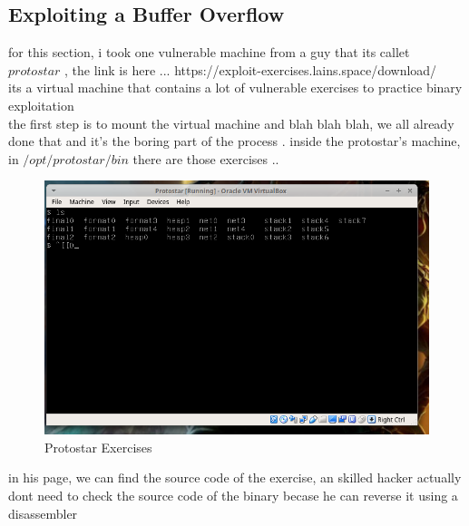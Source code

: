 \documentclass[10pt,a4paper]{article} %
\begin{document}
            \subsection{Exploiting a Buffer Overflow}
                for this section, i took one vulnerable machine from a guy that its
                callet $ protostar  $  , the link is here ...
                https://exploit-exercises.lains.space/download/
                \\ its a virtual machine that contains a lot of vulnerable
                exercises to practice binary exploitation
                \\ the first step is to mount the virtual machine and blah blah
                blah, we all already done that and it's the boring part of the process .
                inside the protostar's machine, in $ /opt/protostar/bin  $ there are those exercises ..
                \\
                \begin{figure}[h!]
                    \centering
                    \includegraphics[width=0.5\linewidth]{proto.png}
                    \caption{Protostar Exercises}
                    \label{fig:proto}
                \end{figure}
                in his page, we can find the source code of the exercise, an
                skilled hacker actually dont need to check the source code of the
                binary becase he can reverse it using a disassembler
                \\
\end{document}
